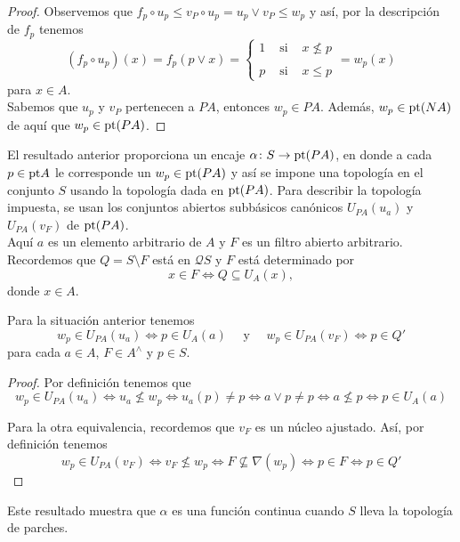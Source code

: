 \begin{proof}
    Observemos que $f_p\circ u_p\leq v_P\circ u_p=u_p\vee v_P\leq w_p$ y así, por la descripción de $f_p$ tenemos
    \[
    (f_p\circ u_p)(x)=f_p(p\vee x)=\left\{ \begin{array}{lcc} 1 & \mbox{ si } & x \nleq p \\ \\ p & \mbox{ si } & x \leq p \end{array} \right.=w_p(x)
    \]
    para $x\in A$.\\

    Sabemos que $u_p$ y $v_P$ pertenecen a $PA$, entonces $w_p\in PA$. Además, $w_p\in \mathrm{pt}(NA)$ de aquí que $w_p\in \mathrm{pt}(PA)$.
\end{proof}

El resultado anterior proporciona un encaje $\alpha\colon S\to \mathrm{pt} (PA)$, en donde a cada $p\in \mathrm{pt} A$ le corresponde un $w_p\in \mathrm{pt} (PA)$ y así se impone una topología en el conjunto $S$ usando la topología dada en $\mathrm{pt} (PA)$. Para describir la topología impuesta, se usan los conjuntos abiertos subbásicos canónicos $U_{PA}(u_a)$ y $U_{PA}(v_F)$ de $\mathrm{pt} (PA)$.\\

Aquí $a$ es un elemento arbitrario de $A$ y $F$ es un filtro abierto arbitrario. Recordemos que $Q=S\setminus F$ está en $\mathcal{Q}S$ y $F$ está determinado por 
\[
x\in F\Leftrightarrow Q\subseteq U_A(x), 
\]
donde $x\in A$.

\begin{lem}\label{Lema9.3.2}
    Para la situación anterior tenemos 
    \[
    w_p\in U_{PA}(u_a)\Leftrightarrow p\in U_A(a)\quad \mbox{ y }\quad w_p\in U_{PA}(v_F)\Leftrightarrow p \in Q'
    \]
    para cada $a\in A$, $F\in A^\wedge$ y $p\in S$.
\end{lem}

\begin{proof}
    Por definición tenemos que 
    \[
    w_p\in U_{PA}(u_a)\Leftrightarrow u_a\nleq w_p\Leftrightarrow u_a(p)\neq p\Leftrightarrow a\vee p\neq p\Leftrightarrow a\nleq p\Leftrightarrow p\in U_A(a)
    \]

    Para la otra equivalencia, recordemos que $v_F$ es un núcleo ajustado. Así, por definición tenemos
    \[
    w_p\in U_{PA}(v_F)\Leftrightarrow v_F\nleq w_p\Leftrightarrow F\nsubseteq \nabla (w_p)\Leftrightarrow p\in F\Leftrightarrow p\in Q'
    \]
\end{proof}

Este resultado muestra que $\alpha$ es una función continua cuando $S$ lleva la topología de parches.

